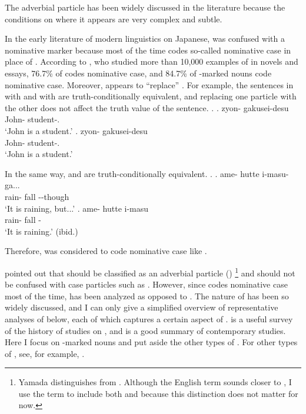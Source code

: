 The adverbial particle  has been widely discussed in the literature
because the conditions on where it appears are very complex and subtle.

In the early literature of modern linguistics on Japanese,
 was confused with a nominative marker
because most of the time  codes so-called nominative case in place of .
According to ,
who studied more than 10,000 examples of 
in novels and essays,
76.7\% of  codes nominative case, and
84.7\% of -marked nouns code nominative case.
Moreover,
 appears to ``replace'' .
For example,
the sentences in \Next[a] with  and \Next[b] with 
are truth-conditionally equivalent, and
replacing one particle with the other does not affect the truth value
of the sentence.
%
\ex.
 \ag. zyon- gakusei-desu \\
      John- student-. \\
      `John is a student.'
 \bg. zyon- gakusei-desu \\
      John- student-. \\
      `John is a student.'
      \hfill{\cite[38]{kuno73}}

In the same way,
\Next[a] and \Next[b] are truth-conditionally equivalent.
%
\ex.
 \ag. ame- hutte i-masu-ga... \\
      rain- fall --though \\
      `It is raining, but...'
 \bg. ame- hutte i-masu \\
      rain- fall - \\
      `It is raining.'
      \hfill{(ibid.)}

Therefore,  was considered to code nominative case like .

 pointed out that
 should be classified as an adverbial particle ()%
 \footnote{
 Yamada distinguishes  from .
 Although the English term  sounds closer to
 ,
 I use the term  to include both
  and 
 because this distinction does not matter for now. 
 }
and should not be confused with case particles such as .
However, since  codes nominative case most of the time,
 has been analyzed as opposed to .
The nature of  has been so widely discussed, and
I can only give a simplified overview of representative analyses of  below,
each of which captures a certain aspect of .
 is a useful survey of the history of studies on ,
and  is a good summary of contemporary studies.
Here I focus on -marked nouns and put aside the other types of .
For other types of ,
see, for example, .

